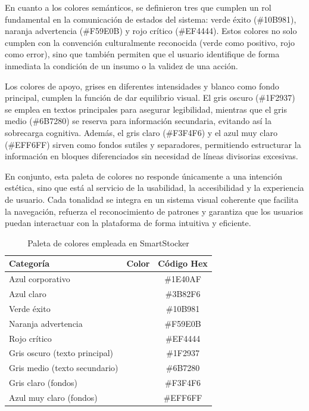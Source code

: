 En cuanto a los colores semánticos, se definieron tres que cumplen un rol fundamental en la comunicación de estados del sistema: verde éxito (\#10B981), naranja advertencia (\#F59E0B) y rojo crítico (\#EF4444). Estos colores no solo cumplen con la convención culturalmente reconocida (verde como positivo, rojo como error), sino que también permiten que el usuario identifique de forma inmediata la condición de un insumo o la validez de una acción.

Los colores de apoyo, grises en diferentes intensidades y blanco como fondo principal, cumplen la función de dar equilibrio visual. El gris oscuro (\#1F2937) se emplea en textos principales para asegurar legibilidad, mientras que el gris medio (\#6B7280) se reserva para información secundaria, evitando así la sobrecarga cognitiva. Además, el gris claro (\#F3F4F6) y el azul muy claro (\#EFF6FF) sirven como fondos sutiles y separadores, permitiendo estructurar la información en bloques diferenciados sin necesidad de líneas divisorias excesivas.

En conjunto, esta paleta de colores no responde únicamente a una intención estética, sino que está al servicio de la usabilidad, la accesibilidad y la experiencia de usuario. Cada tonalidad se integra en un sistema visual coherente que facilita la navegación, refuerza el reconocimiento de patrones y garantiza que los usuarios puedan interactuar con la plataforma de forma intuitiva y eficiente.

\begin{table}[htbp]
    \centering
    \begin{tabular}{|l|c|c|}
        \hline
        \textbf{Categoría} & \textbf{Color} & \textbf{Código Hex} \\ \hline
        Azul corporativo & \cellcolor[HTML]{1E40AF} & \#1E40AF \\ \hline
        Azul claro & \cellcolor[HTML]{3B82F6} & \#3B82F6 \\ \hline
        Verde éxito & \cellcolor[HTML]{10B981} & \#10B981 \\ \hline
        Naranja advertencia & \cellcolor[HTML]{F59E0B} & \#F59E0B \\ \hline
        Rojo crítico & \cellcolor[HTML]{EF4444} & \#EF4444 \\ \hline
        Gris oscuro (texto principal) & \cellcolor[HTML]{1F2937} & \#1F2937 \\ \hline
        Gris medio (texto secundario) & \cellcolor[HTML]{6B7280} & \#6B7280 \\ \hline
        Gris claro (fondos) & \cellcolor[HTML]{F3F4F6} & \#F3F4F6 \\ \hline
        Azul muy claro (fondos) & \cellcolor[HTML]{EFF6FF} & \#EFF6FF \\ \hline
    \end{tabular}
    \caption{Paleta de colores empleada en SmartStocker}
    \label{tab:paleta-colores}
\end{table}

